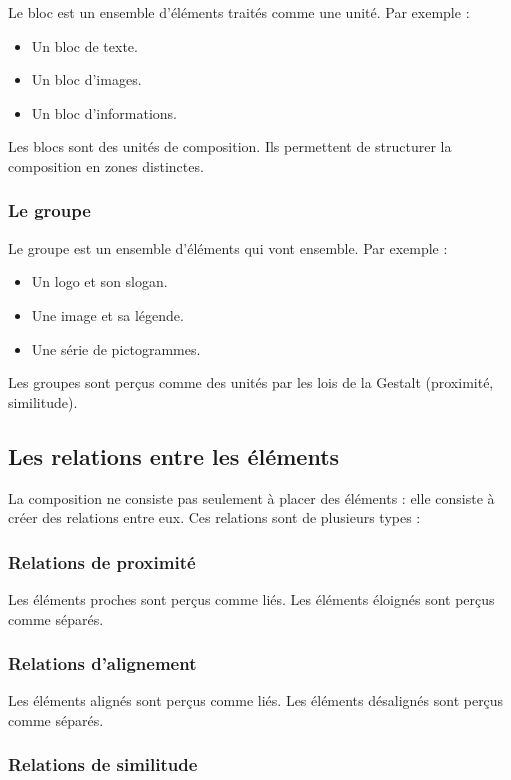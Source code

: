 Le bloc est un ensemble d'éléments traités comme une unité. Par exemple :
\begin{itemize}
  \item Un bloc de texte.
  \item Un bloc d'images.
  \item Un bloc d'informations.
\end{itemize}

Les blocs sont des unités de composition. Ils permettent de structurer la composition en zones distinctes.

\subsubsection{Le groupe}

Le groupe est un ensemble d'éléments qui vont ensemble. Par exemple :
\begin{itemize}
  \item Un logo et son slogan.
  \item Une image et sa légende.
  \item Une série de pictogrammes.
\end{itemize}

Les groupes sont perçus comme des unités par les lois de la Gestalt (proximité, similitude).

\subsection{Les relations entre les éléments}

La composition ne consiste pas seulement à placer des éléments : elle consiste à créer des relations entre eux. Ces relations sont de plusieurs types :

\subsubsection{Relations de proximité}

Les éléments proches sont perçus comme liés. Les éléments éloignés sont perçus comme séparés.

\subsubsection{Relations d'alignement}

Les éléments alignés sont perçus comme liés. Les éléments désalignés sont perçus comme séparés.

\subsubsection{Relations de similitude}

